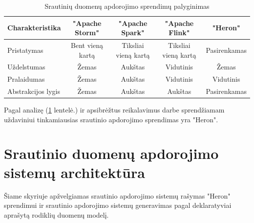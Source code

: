\documentclass{VUMIFPSbakalaurinis}
\begin{document}
\begin{table}[!htbp]
    \begin{center}
        \caption{Srautinių duomenų apdorojimo sprendimų palyginimas}
        \label{table:comparer}
        \begin{tabular}{ | l | c | c | c | c | }
            \hline
            \cellcolor[gray]{0.8} Charakteristika & \cellcolor[gray]{0.9} "Apache Storm" & \cellcolor[gray]{0.9} "Apache Spark" & \cellcolor[gray]{0.9} "Apache Flink" & \cellcolor[gray]{0.9} "Heron" \\* \hline
            \cellcolor[gray]{0.9} Pristatymas & Bent vieną kartą & Tiksliai vieną kartą & Tiksliai vieną kartą & Pasirenkamas \\* \hline
            \cellcolor[gray]{0.9} Uždelstumas & Žemas & Aukštas & Vidutinis & Žemas \\* \hline
            \cellcolor[gray]{0.9} Pralaidumas & Žemas & Aukštas & Vidutinis & Vidutinis \\* \hline
            \cellcolor[gray]{0.9} Abstrakcijos lygis & Žemas & Aukštas & Aukštas & Pasirenkamas \\* \hline
        \end{tabular}
    \end{center}
\end{table}\par

Pagal analizę (\ref{table:comparer} lentelė.) ir apsibrėžtus reikalavimus darbe sprendžiamam uždaviniui tinkamiausias srautinio apdorojimo sprendimas yra "Heron". \par

\section{Srautinio duomenų apdorojimo sistemų architektūra}

Šiame skyriuje apžvelgiamas srautinio apdorojimo sistemų rašymas "Heron" sprendimui ir srautinio apdorojimo sistemų generavimas pagal deklaratyviai aprašytą rodiklių duomenų modelį.
\end{document}
